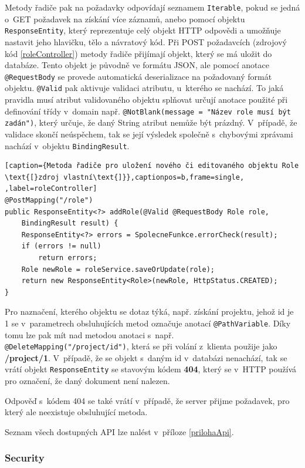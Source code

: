  Metody řadiče pak na požadavky odpovídají seznamem \texttt{Iterable}, pokud se jedná o~GET požadavek na získání více záznamů, anebo pomocí objektu \texttt{ResponseEntity}, který reprezentuje celý objekt HTTP odpovědi a umožňuje nastavit jeho hlavičku, tělo a návratový kód. 
Při POST požadavcích (zdrojový kód \ref{roleController}) metody řadiče přijímají objekt, který se má uložit do databáze. Tento objekt je původně ve formátu JSON, ale pomocí anotace \texttt{@RequestBody} se provede automatická deserializace na požadovaný formát objektu. \texttt{@Valid} pak aktivuje validaci atributu, u~kterého se nachází. To jaká pravidla musí atribut validovaného objektu splňovat určují anotace použité při definování třídy v~domain např. \texttt{@NotBlank(message = "Název role musí být zadán")}, který určuje, že daný String atribut nemůže být prázdný. V~případě, že validace skončí neúspěchem, tak se její výsledek společně s~chybovými zprávami nachází v~objektu \texttt{BindingResult}.

\begin{lstlisting}[caption={Metoda řadiče pro uložení nového či editovaného objektu Role \text{[}zdroj vlastní\text{]}},captionpos=b,frame=single, ,label=roleController]
@PostMapping("/role")
public ResponseEntity<?> addRole(@Valid @RequestBody Role role, 
    BindingResult result) {
    ResponseEntity<?> errors = SpolecneFunkce.errorCheck(result);
    if (errors != null)
        return errors;
    Role newRole = roleService.saveOrUpdate(role);
    return new ResponseEntity<Role>(newRole, HttpStatus.CREATED);
}
\end{lstlisting}

Pro naznačení, kterého objektu se dotaz týká, např. získání projektu, jehož id je 1 se v~parametrech obsluhujících metod označuje anotací \texttt{@PathVariable}. Díky tomu lze pak mít nad metodou anotaci s~např. \texttt{@DeleteMapping("/project/{id}")}, která se při volání z~klienta použije jako \textbf{/project/1}. V~případě, že se objekt s~daným id v~databázi nenachází, tak se vrátí objekt \texttt{ResponseEntity} se stavovým kódem \textbf{404}, který se v~HTTP používá pro označení, že daný dokument není nalezen. 

Odpověď s~kódem 404 se také vrátí v~případě, že server přijme požadavek, pro který ale neexistuje obsluhující metoda.

Seznam všech dostupných API lze nalést v~příloze \ref{prilohaApi}.

\subsubsection *{Security}

